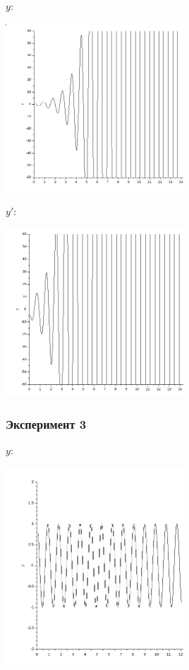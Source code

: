 \documentclass[12pt, a4paper] {ncc}
\begin{document}
$y$:
\begin{center}
\includegraphics[width=0.5\textwidth]{2y}
\end{center}

$y'$:
\begin{center}
\includegraphics[width=0.5\textwidth]{2y1}
\end{center}

\subsubsection{Эксперимент 3}

$y$:
\begin{center}
\includegraphics[width=0.5\textwidth]{3y}
\end{center}
\end{document}

